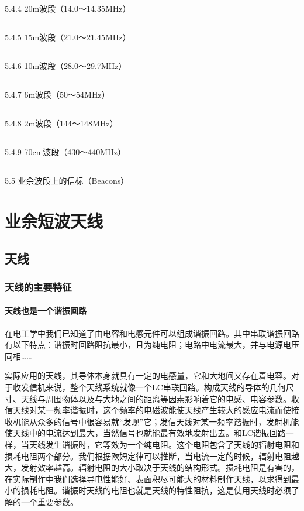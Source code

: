 \documentclass[12pt,UTF8]{ctexbook}
\begin{document}
\section{}5.4.4 20m波段（14.0～14.35MHz）
\section{}5.4.5 15m波段（21.0～21.45MHz）
\section{}5.4.6 10m波段（28.0～29.7MHz）
\section{}5.4.7 6m波段（50～54MHz）
\section{}5.4.8 2m波段（144～148MHz）
\section{}5.4.9 70cm波段（430～440MHz）
\section{}5.5 业余波段上的信标（Beacons）

\chapter{业余短波天线}

\section{天线}

\subsection{天线的主要特征}

\subsubsection{天线也是一个谐振回路}

在电工学中我们已知道了由电容和电感元件可以组成谐振回路。其中串联谐振回路有以下特点：谐振时回路阻抗最小，且为纯电阻；电路中电流最大，并与电源电压同相……

实际应用的天线，其导体本身就具有一定的电感量，它和大地间又存在着电容。对于收发信机来说，整个天线系统就像一个LC串联回路。构成天线的导体的几何尺寸、天线与周围物体以及与大地之间的距离等因素影响着它的电感、电容参数。收信天线对某一频率谐振时，这个频率的电磁波能使天线产生较大的感应电流而使接收机能从众多的信号中很容易就“发现”它；发信天线对某一频率谐振时，发射机能使天线中的电流达到最大，当然信号也就能最有效地发射出去。和LC谐振回路一样，当天线发生谐振时，它等效为一个纯电阻。这个电阻包含了天线的辐射电阻和损耗电阻两个部分。我们根据欧姆定律可以推断，当电流一定的时候，辐射电阻越大，发射效率越高。辐射电阻的大小取决于天线的结构形式。损耗电阻是有害的，在实际制作中我们选择导电性能好、表面积尽可能大的材料制作天线，以求得到最小的损耗电阻。谐振时天线的电阻也就是天线的特性阻抗，这是使用天线时必须了解的一个重要参数。
\end{document}
